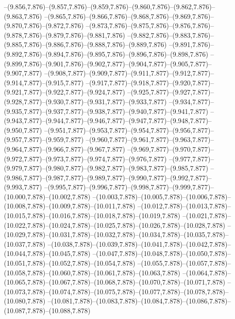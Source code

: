   --(9.856,7.876)--(9.857,7.876)--(9.859,7.876)--(9.860,7.876)--(9.862,7.876)--(9.863,7.876)%
  --(9.865,7.876)--(9.866,7.876)--(9.868,7.876)--(9.869,7.876)--(9.870,7.876)--(9.872,7.876)%
  --(9.873,7.876)--(9.875,7.876)--(9.876,7.876)--(9.878,7.876)--(9.879,7.876)--(9.881,7.876)%
  --(9.882,7.876)--(9.883,7.876)--(9.885,7.876)--(9.886,7.876)--(9.888,7.876)--(9.889,7.876)%
  --(9.891,7.876)--(9.892,7.876)--(9.894,7.876)--(9.895,7.876)--(9.896,7.876)--(9.898,7.876)%
  --(9.899,7.876)--(9.901,7.876)--(9.902,7.877)--(9.904,7.877)--(9.905,7.877)--(9.907,7.877)%
  --(9.908,7.877)--(9.909,7.877)--(9.911,7.877)--(9.912,7.877)--(9.914,7.877)--(9.915,7.877)%
  --(9.917,7.877)--(9.918,7.877)--(9.920,7.877)--(9.921,7.877)--(9.922,7.877)--(9.924,7.877)%
  --(9.925,7.877)--(9.927,7.877)--(9.928,7.877)--(9.930,7.877)--(9.931,7.877)--(9.933,7.877)%
  --(9.934,7.877)--(9.935,7.877)--(9.937,7.877)--(9.938,7.877)--(9.940,7.877)--(9.941,7.877)%
  --(9.943,7.877)--(9.944,7.877)--(9.946,7.877)--(9.947,7.877)--(9.948,7.877)--(9.950,7.877)%
  --(9.951,7.877)--(9.953,7.877)--(9.954,7.877)--(9.956,7.877)--(9.957,7.877)--(9.959,7.877)%
  --(9.960,7.877)--(9.961,7.877)--(9.963,7.877)--(9.964,7.877)--(9.966,7.877)--(9.967,7.877)%
  --(9.969,7.877)--(9.970,7.877)--(9.972,7.877)--(9.973,7.877)--(9.974,7.877)--(9.976,7.877)%
  --(9.977,7.877)--(9.979,7.877)--(9.980,7.877)--(9.982,7.877)--(9.983,7.877)--(9.985,7.877)%
  --(9.986,7.877)--(9.987,7.877)--(9.989,7.877)--(9.990,7.877)--(9.992,7.877)--(9.993,7.877)%
  --(9.995,7.877)--(9.996,7.877)--(9.998,7.877)--(9.999,7.877)--(10.000,7.878)--(10.002,7.878)%
  --(10.003,7.878)--(10.005,7.878)--(10.006,7.878)--(10.008,7.878)--(10.009,7.878)--(10.011,7.878)%
  --(10.012,7.878)--(10.013,7.878)--(10.015,7.878)--(10.016,7.878)--(10.018,7.878)--(10.019,7.878)%
  --(10.021,7.878)--(10.022,7.878)--(10.024,7.878)--(10.025,7.878)--(10.026,7.878)--(10.028,7.878)%
  --(10.029,7.878)--(10.031,7.878)--(10.032,7.878)--(10.034,7.878)--(10.035,7.878)--(10.037,7.878)%
  --(10.038,7.878)--(10.039,7.878)--(10.041,7.878)--(10.042,7.878)--(10.044,7.878)--(10.045,7.878)%
  --(10.047,7.878)--(10.048,7.878)--(10.050,7.878)--(10.051,7.878)--(10.052,7.878)--(10.054,7.878)%
  --(10.055,7.878)--(10.057,7.878)--(10.058,7.878)--(10.060,7.878)--(10.061,7.878)--(10.063,7.878)%
  --(10.064,7.878)--(10.065,7.878)--(10.067,7.878)--(10.068,7.878)--(10.070,7.878)--(10.071,7.878)%
  --(10.073,7.878)--(10.074,7.878)--(10.075,7.878)--(10.077,7.878)--(10.078,7.878)--(10.080,7.878)%
  --(10.081,7.878)--(10.083,7.878)--(10.084,7.878)--(10.086,7.878)--(10.087,7.878)--(10.088,7.878)%
